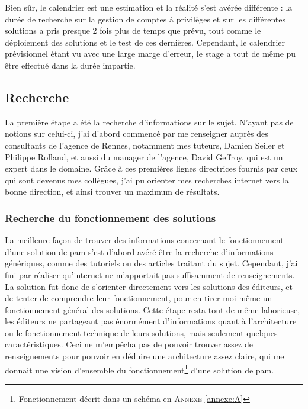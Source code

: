 Bien sûr, le calendrier est une estimation et la réalité s'est avérée différente : la durée de recherche sur la gestion de comptes à privilèges et sur les différentes solutions a pris presque 2 fois plus de temps que prévu, tout comme le déploiement des solutions et le test de ces dernières. Cependant, le calendrier prévisionnel étant vu avec une large marge d'erreur, le stage a tout de même pu être effectué dans la durée impartie.

\subsection{Recherche}
\label{subsec:recherche}

La première étape a été la recherche d'informations sur le sujet. N'ayant pas de notions sur celui-ci, j'ai d'abord commencé par me renseigner auprès des consultants de l'agence de Rennes, notamment mes tuteurs, Damien Seiler et Philippe Rolland, et aussi du manager de l'agence, David Geffroy, qui est un expert dans le domaine. Grâce à ces premières lignes directrices fournis par ceux qui sont devenus mes collègues, j'ai pu orienter mes recherches internet vers la bonne direction, et ainsi trouver un maximum de résultats.

\subsubsection{Recherche du fonctionnement des solutions}
\label{par:fct_sol}
La meilleure façon de trouver des informations concernant le fonctionnement d'une solution de \gls{pam} s'est d'abord avéré être la recherche d'informations génériques, comme des tutoriels ou des articles traitant du sujet. Cependant, j'ai fini par réaliser qu'internet ne m'apportait pas suffisamment de renseignements. La solution fut donc de s'orienter directement vers les solutions des éditeurs, et de tenter de comprendre leur fonctionnement, pour en tirer moi-même un fonctionnement général des solutions. Cette étape resta tout de même laborieuse, les éditeurs ne partageant pas énormément d'informations quant à l'architecture ou le fonctionnement technique de leurs solutions, mais seulement quelques caractéristiques. Ceci ne m'empêcha pas de pouvoir trouver assez de renseignements pour pouvoir en déduire une architecture assez claire, qui me donnait une vision d'ensemble du fonctionnement\footnote{Fonctionnement décrit dans un schéma en \textsc{Annexe} \ref{annexe:A}} d'une solution de \gls{pam}.\\

